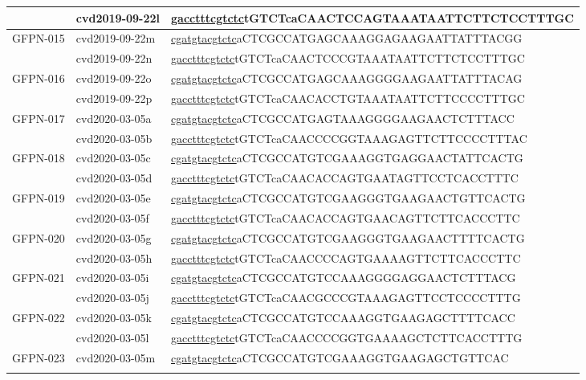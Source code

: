 \begin{landscape}
\begin{longtable}{|l|l|l|}
		& cvd2019-09-22l & \underline{gacctttcgtctc}tGTCTcaCAACTCCAGTAAATAATTCTTCTCCTTTGC \\ \hline
		\multirow{2}{*}{GFPN-015} & cvd2019-09-22m & \underline{cgatgtacgtctc}aCTCGCCATGAGCAAAGGAGAAGAATTATTTACGG   \\ \cline{2-3} 
		& cvd2019-09-22n & \underline{gacctttcgtctc}tGTCTcaCAACTCCCGTAAATAATTCTTCTCCTTTGC \\ \hline
		\multirow{2}{*}{GFPN-016} & cvd2019-09-22o & \underline{cgatgtacgtctc}aCTCGCCATGAGCAAAGGGGAAGAATTATTTACAG   \\ \cline{2-3} 
		& cvd2019-09-22p & \underline{gacctttcgtctc}tGTCTcaCAACACCTGTAAATAATTCTTCCCCTTTGC \\ \hline
		\multirow{2}{*}{GFPN-017} & cvd2020-03-05a & \underline{cgatgtacgtctc}aCTCGCCATGAGTAAAGGGGAAGAACTCTTTACC    \\ \cline{2-3} 
		& cvd2020-03-05b & \underline{gacctttcgtctc}tGTCTcaCAACCCCGGTAAAGAGTTCTTCCCCTTTAC \\ \hline
		\multirow{2}{*}{GFPN-018} & cvd2020-03-05c & \underline{cgatgtacgtctc}aCTCGCCATGTCGAAAGGTGAGGAACTATTCACTG   \\ \cline{2-3} 
		& cvd2020-03-05d & \underline{gacctttcgtctc}tGTCTcaCAACACCAGTGAATAGTTCCTCACCTTTC  \\ \hline
		\multirow{2}{*}{GFPN-019} & cvd2020-03-05e & \underline{cgatgtacgtctc}aCTCGCCATGTCGAAGGGTGAAGAACTGTTCACTG   \\ \cline{2-3} 
		& cvd2020-03-05f & \underline{gacctttcgtctc}tGTCTcaCAACACCAGTGAACAGTTCTTCACCCTTC  \\ \hline
		\multirow{2}{*}{GFPN-020} & cvd2020-03-05g & \underline{cgatgtacgtctc}aCTCGCCATGTCGAAGGGTGAAGAACTTTTCACTG   \\ \cline{2-3} 
		& cvd2020-03-05h & \underline{gacctttcgtctc}tGTCTcaCAACCCCAGTGAAAAGTTCTTCACCCTTC  \\ \hline
		\multirow{2}{*}{GFPN-021} & cvd2020-03-05i & \underline{cgatgtacgtctc}aCTCGCCATGTCCAAAGGGGAGGAACTCTTTACG    \\ \cline{2-3} 
		& cvd2020-03-05j & \underline{gacctttcgtctc}tGTCTcaCAACGCCCGTAAAGAGTTCCTCCCCTTTG  \\ \hline
		\multirow{2}{*}{GFPN-022} & cvd2020-03-05k & \underline{cgatgtacgtctc}aCTCGCCATGTCCAAAGGTGAAGAGCTTTTCACC    \\ \cline{2-3} 
		& cvd2020-03-05l & \underline{gacctttcgtctc}tGTCTcaCAACCCCGGTGAAAAGCTCTTCACCTTTG  \\ \hline
		\multirow{2}{*}{GFPN-023} & cvd2020-03-05m & \underline{cgatgtacgtctc}aCTCGCCATGTCGAAAGGTGAAGAGCTGTTCAC     \\ \cline{2-3} 

\end{longtable}
\end{landscape}
